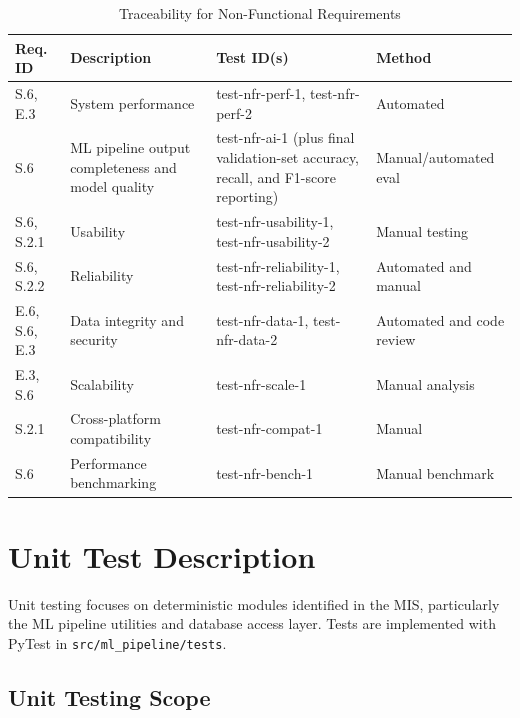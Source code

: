 \documentclass[12pt, titlepage]{article}
\begin{document}
\newpage
\begin{table}[ht]
    \centering
    \begin{tabular}{|p{2cm}|p{4cm}|p{4cm}|p{2.5cm}|}
        \hline
        \textbf{Req. ID} & \textbf{Description} & \textbf{Test ID(s)} & \textbf{Method} \\
        \hline
        S.6, E.3 & System performance & test-nfr-perf-1, test-nfr-perf-2 & Automated \\
        \hline
        S.6 & ML pipeline output completeness and model quality & test-nfr-ai-1 (plus final validation-set accuracy, recall, and F1-score reporting) & Manual/automated eval \\
        \hline
        S.6, S.2.1 & Usability & test-nfr-usability-1, test-nfr-usability-2 & Manual testing \\
        \hline
        S.6, S.2.2 & Reliability & test-nfr-reliability-1, test-nfr-reliability-2 & Automated and manual \\
        \hline
        E.6, S.6, E.3 & Data integrity and security & test-nfr-data-1, test-nfr-data-2 & Automated and code review \\
        \hline
        E.3, S.6 & Scalability & test-nfr-scale-1 & Manual analysis \\
        \hline
        S.2.1 & Cross-platform compatibility & test-nfr-compat-1 & Manual \\
        \hline
        S.6 & Performance benchmarking & test-nfr-bench-1 & Manual benchmark \\
        \hline
    \end{tabular}
    \caption{Traceability for Non-Functional Requirements}
\end{table}

\section{Unit Test Description}

Unit testing focuses on deterministic modules identified in the MIS, particularly the ML pipeline utilities and database access layer. Tests are implemented with PyTest in \texttt{src/ml\_pipeline/tests}.

\subsection{Unit Testing Scope}
\end{document}
